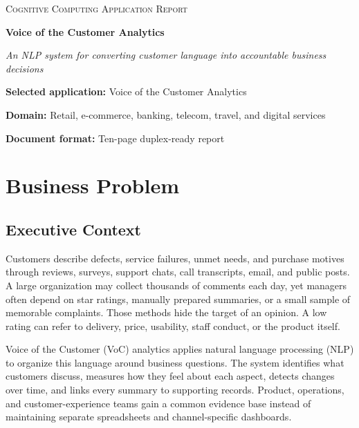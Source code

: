\documentclass[11pt,a4paper,twoside]{article}
\begin{document}
\thispagestyle{plain}

\begin{center}
\vspace*{0.2em}
{\small\scshape Cognitive Computing Application Report\par}
\vspace{0.65em}
{\fontsize{25}{30}\selectfont\bfseries Voice of the Customer Analytics\par}
\vspace{0.3em}
{\large\itshape An NLP system for converting customer language into accountable business decisions\par}
\vspace{0.6em}
{\small
\textbf{Selected application:} Voice of the Customer Analytics\par
\textbf{Domain:} Retail, e-commerce, banking, telecom, travel, and digital services\par
\textbf{Document format:} Ten-page duplex-ready report\par}
\end{center}

\section{Business Problem}

\subsection{Executive Context}

Customers describe defects, service failures, unmet needs, and purchase motives through reviews, surveys, support chats, call transcripts, email, and public posts. A large organization may collect thousands of comments each day, yet managers often depend on star ratings, manually prepared summaries, or a small sample of memorable complaints. Those methods hide the target of an opinion. A low rating can refer to delivery, price, usability, staff conduct, or the product itself.

Voice of the Customer (VoC) analytics applies natural language processing (NLP) to organize this language around business questions. The system identifies what customers discuss, measures how they feel about each aspect, detects changes over time, and links every summary to supporting records. Product, operations, and customer-experience teams gain a common evidence base instead of maintaining separate spreadsheets and channel-specific dashboards.
\end{document}
